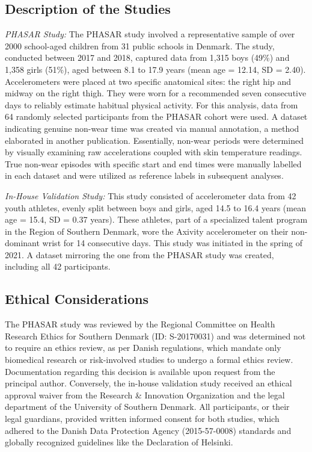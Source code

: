 \documentclass[
  10pt,
]{scrbook}
\begin{document}
\hypertarget{description-of-the-studies}{%
\subsection{Description of the
Studies}\label{description-of-the-studies}}

\emph{PHASAR Study:} The PHASAR study involved a representative sample
of over 2000 school-aged children from 31 public schools in Denmark. The
study, conducted between 2017 and 2018, captured data from 1,315 boys
(49\%) and 1,358 girls (51\%), aged between 8.1 to 17.9 years (mean age
= 12.14, SD = 2.40). Accelerometers were placed at two specific
anatomical sites: the right hip and midway on the right thigh. They were
worn for a recommended seven consecutive days to reliably estimate
habitual physical activity. For this analysis, data from 64 randomly
selected participants from the PHASAR cohort were used. A dataset
indicating genuine non-wear time was created via manual annotation, a
method elaborated in another publication. Essentially, non-wear periods
were determined by visually examining raw accelerations coupled with
skin temperature readings. True non-wear episodes with specific start
and end times were manually labelled in each dataset and were utilized
as reference labels in subsequent analyses.

\emph{In-House Validation Study:} This study consisted of accelerometer
data from 42 youth athletes, evenly split between boys and girls, aged
14.5 to 16.4 years (mean age = 15.4, SD = 0.37 years). These athletes,
part of a specialized talent program in the Region of Southern Denmark,
wore the Axivity accelerometer on their non-dominant wrist for 14
consecutive days. This study was initiated in the spring of 2021. A
dataset mirroring the one from the PHASAR study was created, including
all 42 participants.

\hypertarget{ethical-considerations}{%
\subsection{Ethical Considerations}\label{ethical-considerations}}

The PHASAR study was reviewed by the Regional Committee on Health
Research Ethics for Southern Denmark (ID: S-20170031) and was determined
not to require an ethics review, as per Danish regulations, which
mandate only biomedical research or risk-involved studies to undergo a
formal ethics review. Documentation regarding this decision is available
upon request from the principal author. Conversely, the in-house
validation study received an ethical approval waiver from the Research
\& Innovation Organization and the legal department of the University of
Southern Denmark. All participants, or their legal guardians, provided
written informed consent for both studies, which adhered to the Danish
Data Protection Agency (2015-57-0008) standards and globally recognized
guidelines like the Declaration of Helsinki.
\end{document}
